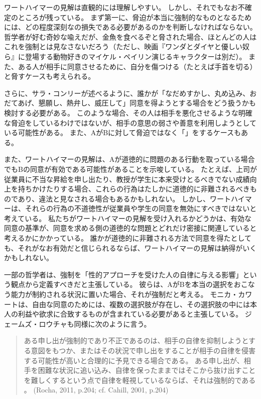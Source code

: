 \documentclass[paper=a4,book,openany]{jlreq}
\newcommand{\ig}[1]{}           %
\begin{document}
ワートハイマーの見解は直観的には理解しやすい。
しかし、それでもなお不確定のところが残っている。
まず第一に、脅迫が本当に強制的なものとなるためには、どの程度深刻なの損失である必要があるのかを判断しなければならない。
哲学者が好む奇妙な喩えだが、金魚を食べるぞと脅された場合、ほとんどの人はこれを強制とは見なさないだろう（ただし、映画『ワンダとダイヤと優しい奴ら』に登場する動物好きのマイケル・ペイリン演じるキャラクターは別だ）。
また、ある人が相手に同意させるために、自分を傷つける（たとえば手首を切る）と脅すケースも考えられる\citep[p.280]{husak06:_compl_guide_consen_sex}。

さらに、サラ・コンリーが述べるように、誰かが「なだめすかし、丸め込み、おだてあげ、懇願し、熱弁し、威圧して」同意を得ようとする場合をどう扱うかも検討する必要がある\citep[p.115]{conly04:seductionrapecoercion}。
このような場合、その人は相手を悪化させるような明確な脅迫をしているわけではないが、相手の意思の弱さや善意を利用しようとしている可能性がある。
また、AがBに対して脅迫ではなく「」をするケースもある。

また、ワートハイマーの見解は、Aが道徳的に問題のある行動を取っている場合でもBの同意が有効である可能性があることを示唆している。
たとえば、上司が従業員に不当な昇給を申し出たり、教授が学生に本来受けとるべきでない成績向上を持ちかけたりする場合、これらの行為はたしかに道徳的に非難されるべきものであり、違法と見なされる場合もあるかもしれない。
しかし、ワートハイマーは、それらの行為の不道徳性が従業員や学生の同意を無効にすべきではないと考えている。
私たちがワートハイマーの見解を受け入れるかどうかは、有効な同意の基準が、同意を求める側の道徳的な問題とどれだけ密接に関連していると考えるかにかかっている。
誰かが道徳的に非難される方法で同意を得たとしても、それがなお有効だと信じられるならば、ワートハイマーの見解は納得がいくかもしれない。

一部の哲学者は、強制を「性的アプローチを受けた人の自律に与える影響」という観点から定義すべきだと主張している。
彼らは、AがBを本当の選択をおこなう能力が制約される状況に置いた場合、それが強制だと考える。
モニカ・カワート\ig{Monica Cowart}は、自由な同意のためには、複数の選択肢が存在し、その選択肢の中には本人の利益や欲求に合致するものが含まれている必要があると主張している\citep{cowart04:_under_acts_consen}。
ジェームズ・ロウチャも同様に次のように言う。

\begin{quote}
ある申し出が強制的であり不正であるのは、相手の自律を抑制しようとする意図をもつか、またはその状況で申し出をすることが相手の自律を侵害する可能性が高いと合理的に予見できる場合である。
ある申し出が、相手を困難な状況に追い込み、自律を保ったままではそこから抜け出すことを難しくするという点で自律を軽視しているならば、それは強制的である  \nocite{rocha11:_sexual_haras_coerc_offer} \nocite{cahill01:_rethin_rape}。
(Rocha, 2011, p.204; cf. Cahill, 2001, p.204)

\end{quote}
\end{document}
